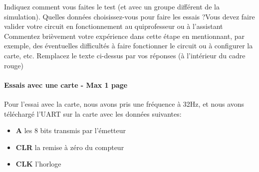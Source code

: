 \documentclass[a4paper]{article} %
\begin{document}
\begin{tcolorbox}[colframe=Monokaimagenta,colback=white]

Indiquez comment vous faites le test (et avec un groupe différent de la simulation). Quelles données choisissez-vous pour faire les essais ?Vous devez faire valider votre circuit en fonctionnement au quiprofesseur ou à l’assistant
Commentez brièvement votre expérience dans cette étape en mentionnant, par exemple, des éventuelles difficultés à faire fonctionner le circuit ou à configurer la carte, etc.
Remplacez le texte ci-dessus par vos réponses (à l’intérieur du cadre rouge)\\

\paragraph{Essais avec une carte - Max 1 page}
Pour l'essai avec la carte, nous avons pris une fréquence à 32Hz, et nous avons téléchargé l'UART sur la carte avec les données suivantes:
\begin{itemize}
    \item     \textbf{A} les 8 bits transmis par l'émetteur
    \item     \textbf{CLR} la remise à zéro du compteur
    \item     \textbf{CLK} l'horloge
\end{itemize}


\end{tcolorbox}
\end{document}
